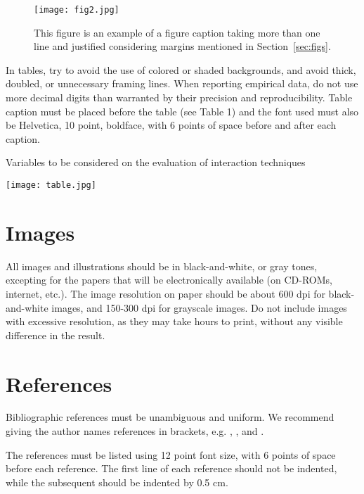 \documentclass[12pt]{article}
\begin{document}
\begin{figure}[ht]
\centering
\texttt{[image: fig2.jpg]}
\caption{This figure is an example of a figure caption taking more than one
  line and justified considering margins mentioned in Section~\ref{sec:figs}.}
\label{fig:exampleFig2}
\end{figure}

In tables, try to avoid the use of colored or shaded backgrounds, and avoid
thick, doubled, or unnecessary framing lines. When reporting empirical data,
do not use more decimal digits than warranted by their precision and
reproducibility. Table caption must be placed before the table (see Table 1)
and the font used must also be Helvetica, 10 point, boldface, with 6 points of
space before and after each caption.

\begin{table}[ht]
\centering
\caption{Variables to be considered on the evaluation of interaction
  techniques}
\label{tab:exTable1}
\texttt{[image: table.jpg]}
\end{table}

\section{Images}

All images and illustrations should be in black-and-white, or gray tones,
excepting for the papers that will be electronically available (on CD-ROMs,
internet, etc.). The image resolution on paper should be about 600 dpi for
black-and-white images, and 150-300 dpi for grayscale images.  Do not include
images with excessive resolution, as they may take hours to print, without any
visible difference in the result. 

\section{References}

Bibliographic references must be unambiguous and uniform.  We recommend giving
the author names references in brackets, e.g. \cite{knuth:84},
\cite{boulic:91}, and \cite{smith:99}.

The references must be listed using 12 point font size, with 6 points of space
before each reference. The first line of each reference should not be
indented, while the subsequent should be indented by 0.5 cm.



\end{document}
